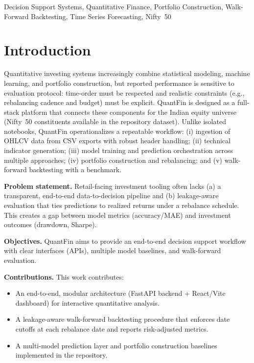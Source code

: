 \documentclass[conference]{IEEEtran}
\begin{document}
\begin{IEEEkeywords}
Decision Support Systems, Quantitative Finance, Portfolio Construction, Walk-Forward Backtesting, Time Series Forecasting, Nifty~50
\end{IEEEkeywords}

\section{Introduction}\label{sec:intro}
Quantitative investing systems increasingly combine statistical modeling, machine learning, and portfolio construction, but reported performance is sensitive to evaluation protocol: time-order must be respected and realistic constraints (e.g., rebalancing cadence and budget) must be explicit. QuantFin is designed as a full-stack platform that connects these components for the Indian equity universe (Nifty~50 constituents available in the repository dataset). Unlike isolated notebooks, QuantFin operationalizes a repeatable workflow: (i) ingestion of OHLCV data from CSV exports with robust header handling; (ii) technical indicator generation; (iii) model training and prediction orchestration across multiple approaches; (iv) portfolio construction and rebalancing; and (v) walk-forward backtesting with a benchmark.

\textbf{Problem statement.} Retail-facing investment tooling often lacks (a) a transparent, end-to-end data-to-decision pipeline and (b) leakage-aware evaluation that ties predictions to realized returns under a rebalance schedule. This creates a gap between model metrics (accuracy/MAE) and investment outcomes (drawdown, Sharpe).

\textbf{Objectives.} QuantFin aims to provide an end-to-end decision support workflow with clear interfaces (APIs), multiple model baselines, and walk-forward evaluation.

\textbf{Contributions.} This work contributes:
\begin{itemize}
\item An end-to-end, modular architecture (FastAPI backend + React/Vite dashboard) for interactive quantitative analysis.
\item A leakage-aware walk-forward backtesting procedure that enforces date cutoffs at each rebalance date and reports risk-adjusted metrics.
\item A multi-model prediction layer and portfolio construction baselines implemented in the repository.
\end{itemize}
\end{document}
